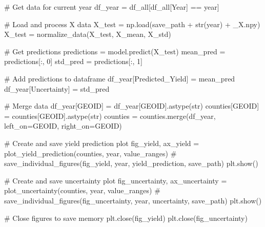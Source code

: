 \documentclass[
  letterpaper,
  DIV=11,
  numbers=noendperiod]{scrreprt}
\newenvironment{Shaded}{\begin{snugshade}}{\end{snugshade}}
\newcommand{\BuiltInTok}[1]{\textcolor[rgb]{0.00,0.23,0.31}{#1}}
\newcommand{\CommentTok}[1]{\textcolor[rgb]{0.37,0.37,0.37}{#1}}
\newcommand{\DecValTok}[1]{\textcolor[rgb]{0.68,0.00,0.00}{#1}}
\newcommand{\NormalTok}[1]{\textcolor[rgb]{0.00,0.23,0.31}{#1}}
\newcommand{\OperatorTok}[1]{\textcolor[rgb]{0.37,0.37,0.37}{#1}}
\newcommand{\StringTok}[1]{\textcolor[rgb]{0.13,0.47,0.30}{#1}}
\begin{document}
\begin{Shaded}
\begin{Highlighting}[]
    \CommentTok{\# Get data for current year}
\NormalTok{    df\_year }\OperatorTok{=}\NormalTok{ df\_all[df\_all[}\StringTok{\textquotesingle{}Year\textquotesingle{}}\NormalTok{] }\OperatorTok{==}\NormalTok{ year]}

    \CommentTok{\# Load and process X data}
\NormalTok{    X\_test }\OperatorTok{=}\NormalTok{ np.load(save\_path }\OperatorTok{+} \BuiltInTok{str}\NormalTok{(year) }\OperatorTok{+} \StringTok{\textquotesingle{}\_X.npy\textquotesingle{}}\NormalTok{)}
\NormalTok{    X\_test }\OperatorTok{=}\NormalTok{ normalize\_data(X\_test, X\_mean, X\_std)}

    \CommentTok{\# Get predictions}
\NormalTok{    predictions }\OperatorTok{=}\NormalTok{ model.predict(X\_test)}
\NormalTok{    mean\_pred }\OperatorTok{=}\NormalTok{ predictions[:, }\DecValTok{0}\NormalTok{]}
\NormalTok{    std\_pred }\OperatorTok{=}\NormalTok{ predictions[:, }\DecValTok{1}\NormalTok{]}

    \CommentTok{\# Add predictions to dataframe}
\NormalTok{    df\_year[}\StringTok{\textquotesingle{}Predicted\_Yield\textquotesingle{}}\NormalTok{] }\OperatorTok{=}\NormalTok{ mean\_pred}
\NormalTok{    df\_year[}\StringTok{\textquotesingle{}Uncertainty\textquotesingle{}}\NormalTok{] }\OperatorTok{=}\NormalTok{ std\_pred}

    \CommentTok{\# Merge data}
\NormalTok{    df\_year[}\StringTok{\textquotesingle{}GEOID\textquotesingle{}}\NormalTok{] }\OperatorTok{=}\NormalTok{ df\_year[}\StringTok{\textquotesingle{}GEOID\textquotesingle{}}\NormalTok{].astype(}\BuiltInTok{str}\NormalTok{)}
\NormalTok{    counties[}\StringTok{\textquotesingle{}GEOID\textquotesingle{}}\NormalTok{] }\OperatorTok{=}\NormalTok{ counties[}\StringTok{\textquotesingle{}GEOID\textquotesingle{}}\NormalTok{].astype(}\BuiltInTok{str}\NormalTok{)}
\NormalTok{    counties }\OperatorTok{=}\NormalTok{ counties.merge(df\_year, left\_on}\OperatorTok{=}\StringTok{\textquotesingle{}GEOID\textquotesingle{}}\NormalTok{, right\_on}\OperatorTok{=}\StringTok{\textquotesingle{}GEOID\textquotesingle{}}\NormalTok{)}

    \CommentTok{\# Create and save yield prediction plot}
\NormalTok{    fig\_yield, ax\_yield }\OperatorTok{=}\NormalTok{ plot\_yield\_prediction(counties, year, value\_ranges)}
    \CommentTok{\# save\_individual\_figures(fig\_yield, year, \textquotesingle{}yield\_prediction\textquotesingle{}, save\_path)}
\NormalTok{    plt.show()}

    \CommentTok{\# Create and save uncertainty plot}
\NormalTok{    fig\_uncertainty, ax\_uncertainty }\OperatorTok{=}\NormalTok{ plot\_uncertainty(counties, year, value\_ranges)}
    \CommentTok{\# save\_individual\_figures(fig\_uncertainty, year, \textquotesingle{}uncertainty\textquotesingle{}, save\_path)}
\NormalTok{    plt.show()}

    \CommentTok{\# Close figures to save memory}
\NormalTok{    plt.close(fig\_yield)}
\NormalTok{    plt.close(fig\_uncertainty)}
\end{Highlighting}
\end{Shaded}
\end{document}
